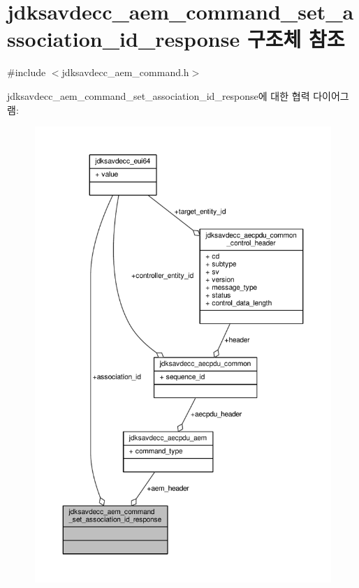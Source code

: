 \hypertarget{structjdksavdecc__aem__command__set__association__id__response}{}\section{jdksavdecc\+\_\+aem\+\_\+command\+\_\+set\+\_\+association\+\_\+id\+\_\+response 구조체 참조}
\label{structjdksavdecc__aem__command__set__association__id__response}


{\ttfamily \#include $<$jdksavdecc\+\_\+aem\+\_\+command.\+h$>$}



jdksavdecc\+\_\+aem\+\_\+command\+\_\+set\+\_\+association\+\_\+id\+\_\+response에 대한 협력 다이어그램\+:
\nopagebreak
\begin{figure}[H]
\begin{center}
\leavevmode
\includegraphics[width=350pt]{structjdksavdecc__aem__command__set__association__id__response__coll__graph}
\end{center}
\end{figure}
